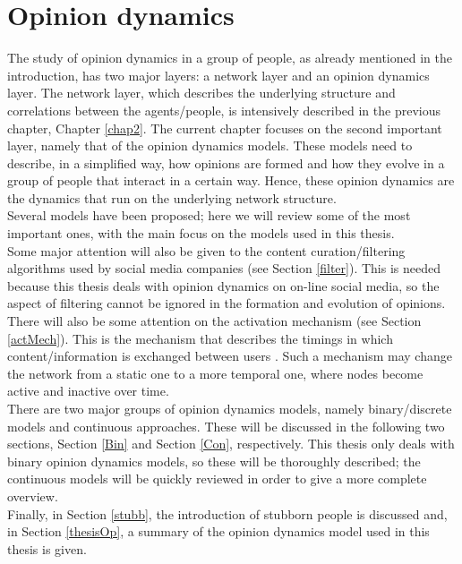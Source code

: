 \documentclass[11 pt , letterpaper , twoside , openright]{book}
\begin{document}
\chapter{Opinion dynamics}
\label{chap3}
The study of opinion dynamics in a group of people, as already mentioned in the introduction, has two major layers: a network layer and an opinion dynamics layer. The network layer, which describes the underlying structure and correlations between the agents/people, is intensively described in the previous chapter, Chapter \ref{chap2}. The current chapter focuses on the second important layer, namely that of the opinion dynamics models. These models need to describe, in a simplified way, how opinions are formed and how they evolve in a group of people that interact in a certain way. Hence, these opinion dynamics are the dynamics that run on the underlying network structure.\\
Several models have been proposed; here we will review some of the most important ones, with the main focus on the models used in this thesis.\\
\newline
Some major attention will also be given to the content curation/filtering algorithms used by social media companies (see Section \ref{filter}). This is needed because this thesis deals with opinion dynamics on on-line social media, so the aspect of filtering cannot be ignored in the formation and evolution of opinions.\\
\newline
There will also be some attention on the activation mechanism (see Section \ref{actMech}). This is the mechanism that describes the timings in which content/information is exchanged between users \cite{Perra2019}. Such a mechanism may change the network from a static one to a more temporal one, where nodes become active and inactive over time. \\
\newline
There are two major groups of opinion dynamics models, namely binary/discrete models and continuous approaches. These will be discussed in the following two sections, Section \ref{Bin} and Section \ref{Con}, respectively. This thesis only deals with binary opinion dynamics models, so these will be thoroughly described; the continuous models will be quickly reviewed in order to give a more complete overview.\\
\newline
Finally, in Section \ref{stubb}, the introduction of stubborn people is discussed and, in Section \ref{thesisOp}, a summary of the opinion dynamics model used in this thesis is given.
\end{document}
